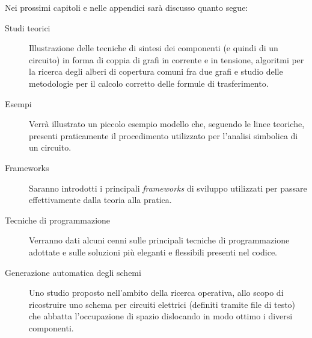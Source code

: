 Nei prossimi capitoli e nelle appendici sarà discusso quanto segue:
\begin{description}
 \item[Studi teorici] Illustrazione delle tecniche di sintesi dei componenti (e quindi di un circuito) in forma di coppia di grafi in corrente e in tensione, algoritmi per la ricerca degli alberi di copertura comuni fra due grafi e studio delle metodologie per il calcolo corretto delle formule di trasferimento.
 \item[Esempi] Verrà illustrato un piccolo esempio modello che, seguendo le linee teoriche, presenti praticamente il procedimento utilizzato per l'analisi simbolica di un circuito.
 \item[Frameworks] Saranno introdotti i principali \textit{frameworks} di sviluppo utilizzati per passare effettivamente dalla teoria alla pratica.
 \item[Tecniche di programmazione] Verranno dati alcuni cenni sulle principali tecniche di programmazione adottate e sulle soluzioni più eleganti e flessibili presenti nel codice.
 \item[Generazione automatica degli schemi] Uno studio proposto nell'ambito della ricerca operativa, allo scopo di ricostruire uno schema per circuiti elettrici (definiti tramite file di testo) che abbatta l'occupazione di spazio dislocando in modo ottimo i diversi componenti.
\end{description}
